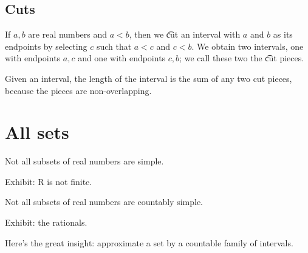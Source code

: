 \subsection*{Cuts}

If $a, b$ are real numbers and $a < b$, then we \t{cut} an interval with $a$ and $b$ as its endpoints by selecting $c$ such that $a < c$ and $c < b$.
We obtain two intervals, one with endpoints $a,c$ and one with endpoints $c, b$; we call these two the \t{cut pieces}.

Given an interval, the length of the interval is the sum of any two cut pieces, because the pieces are non-overlapping.

\section*{All sets}

\begin{proposition}
Not all subsets of real numbers are simple.

Exhibit: R is not finite.

\end{proposition}

\begin{proposition}
Not all subsets of real numbers are countably simple.

Exhibit: the rationals.

\end{proposition}

Here's the great insight: approximate a set by a countable family of intervals.

